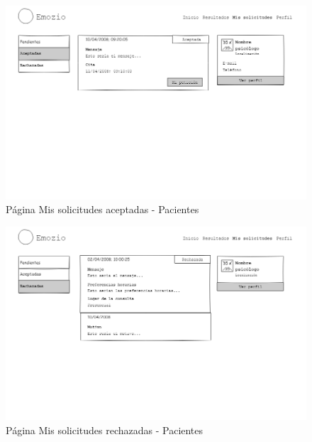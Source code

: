 \begin{figure}[htbp] 
    \centering
    \includegraphics[width=1\textwidth]{figuras/mockup_pacientes/mailaceptadas.png}
    \caption{Página Mis solicitudes aceptadas - Pacientes}
\end{figure}	

\begin{figure}[htbp] 
    \centering
    \includegraphics[width=1\textwidth]{figuras/mockup_pacientes/mailrechazadas.png}
    \caption{Página Mis solicitudes rechazadas - Pacientes}
\end{figure}	

